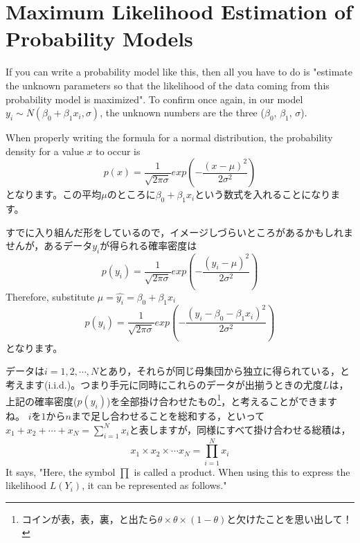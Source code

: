 \documentclass{ltjbook}
\begin{document}
\section{Maximum Likelihood Estimation of Probability Models}

If you can write a probability model like this, then all you have to do is "estimate the unknown parameters so that the likelihood of the data coming from this probability model is maximized".
To confirm once again, in our model $y_i \sim N(\beta_0 + \beta_1x_i, \sigma)$, the unknown numbers are the three ($\beta_0$, $\beta_1$, $\sigma$).


When properly writing the formula for a normal distribution, the probability density for a value $x$ to occur is
\[ p(x) = \frac{1}{\sqrt{2\pi \sigma}}exp\left( - \frac{(x-\mu)^2}{2\sigma^2}\right)\]
となります。この平均$\mu$のところに$\beta_0 + \beta_1 x_i$という数式を入れることになります。

すでに入り組んだ形をしているので，イメージしづらいところがあるかもしれませんが，あるデータ$y_i$が得られる確率密度は
\[ p(y_i) = \frac{1}{\sqrt{2\pi \sigma}}exp\left( -\frac{(y_i-\mu)^2}{2\sigma^2}\right)\]
Therefore, substitute $\mu=\hat{y_i} = \beta_0 + \beta_1 x_i$
\[ p(y_i) = \frac{1}{\sqrt{2\pi \sigma}}exp\left( -\frac{(y_i-\beta_0 - \beta_1 x_i)^2}{2\sigma^2}\right)\]
となります。

データは$i = 1,2,\cdots,N$とあり，それらが同じ母集団から独立に得られている，と考えます(i.i.d.)。つまり手元に同時にこれらのデータが出揃うときの尤度$L$は，上記の確率密度($p(y_i)$)を全部掛け合わせたもの\footnote{コインが表，表，裏，と出たら$\theta \times \theta \times (1-\theta)$と欠けたことを思い出して！}，と考えることができますね。
$i$を$1$から$n$まで足し合わせることを総和する，といって$x_1+x_2+\cdots+x_N=\sum_{i=1}^N x_i$と表しますが，同様にすべて掛け合わせる総積は，
\[ x_1 \times x_2 \times \cdots x_N = \prod_{i=1}^N x_i \]
It says, "Here, the symbol $\prod$ is called a product. When using this to express the likelihood $L(Y_i)$, it can be represented as follows."
\end{document}
